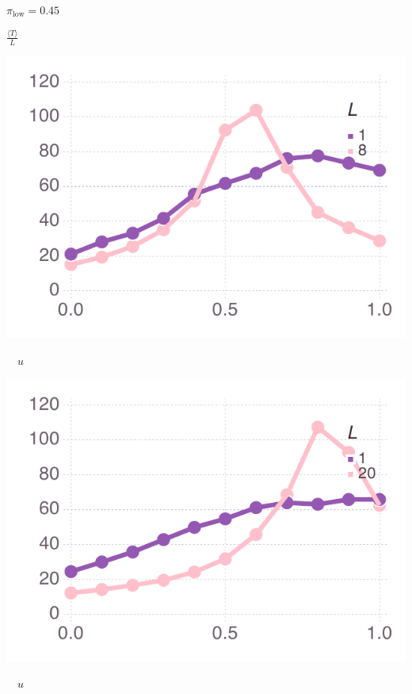 \documentclass[varwidth=true,crop=false]{standalone}
\newcommand{\pisub}[1]{\pi_{\mathrm{#1}}}
\newcommand{\pilow}{\pisub{low}}
\newcommand{\meanvar}[1]{\langle #1 \rangle}
\newcommand{\meanT}{\meanvar{T}}
\begin{document}
    \begin{minipage}{3.75in}
    \begin{rotate}{90}
      {\parbox{2.5in}{
          \centering
          \vspace{-2.5em} {\huge$ \pilow = 0.45$} \\
          {\begin{rotate}{-90}{\huge $\frac{\meanT}{L}$}\hspace{3em}\end{rotate}}
      }}
    \end{rotate}%
    \hspace{2em}
      \includegraphics[width=\textwidth]{Figures/step_over_u_lowpayoff=0.45_nbehaviors=4.pdf}
        \\[-2.75em]
        \begin{center}
          {\hspace{3.25em} \huge $\quad u$}
      \end{center}
        \end{minipage}\noindent\begin{minipage}{3.75in}%
      \includegraphics[width=\textwidth]{Figures/step_over_u_lowpayoff=0.45_nbehaviors=10.pdf}
      \\[-2.75em]
      \begin{center}
        {\huge $\quad u$}
      \end{center}
    \end{minipage}
\end{document}
